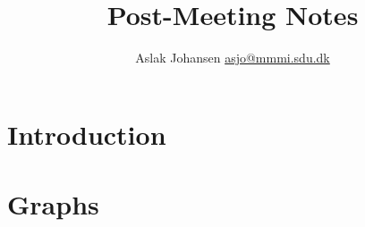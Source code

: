 \documentclass{article}
\title{Post-Meeting Notes\\\scalebox{.85}{from 23rd Mar, 2016}}
\author{Aslak Johansen \href{mailto:asjo@mmmi.sdu.dk}{asjo@mmmi.sdu.dk}}
\begin{document}
\maketitle
\tableofcontents
\newpage

\section{Introduction}

\section{Graphs}
\end{document}
